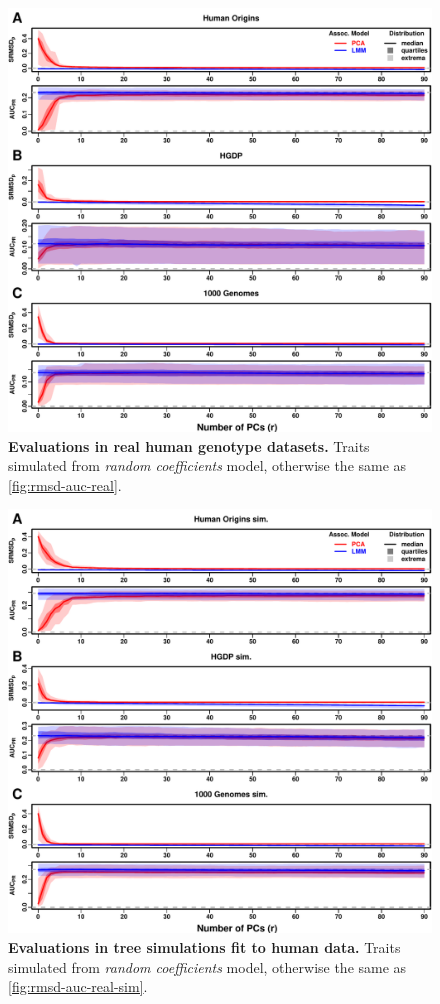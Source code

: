 \documentclass[11pt]{article}
\begin{document}
\begin{figure}[bp!]
  \centering
  \includegraphics[width=\textwidth,height=\textheight,keepaspectratio]{rmsd-auc-real.pdf}
  \caption{
    {\small 
      {\bf Evaluations in real human genotype datasets.}
      Traits simulated from \textit{random coefficients} model, otherwise the same as \cref{fig:rmsd-auc-real}.
    }
  }
  \label{fig:rmsd-auc-real-rc}
\end{figure}

\begin{figure}[bp!]
  \centering
  \includegraphics[width=\textwidth,height=\textheight,keepaspectratio]{rmsd-auc-real-sim.pdf}
  \caption{
    {\small 
      {\bf Evaluations in tree simulations fit to human data.}
      Traits simulated from \textit{random coefficients} model, otherwise the same as \cref{fig:rmsd-auc-real-sim}.
    }
  }
  \label{fig:rmsd-auc-real-sim-rc}
\end{figure}
\end{document}
